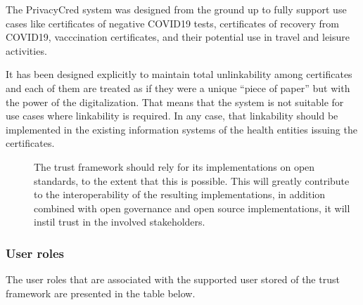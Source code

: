 \documentclass[a4paper,12pt,english]{sphinxhowto}
\begin{document}
\begin{sphinxShadowBox}

\sphinxAtStartPar
The PrivacyCred system was designed from the ground up to fully support use cases like certificates of negative COVID\sphinxhyphen{}19 tests, certificates of recovery from COVID\sphinxhyphen{}19, vacccination certificates, and their potential use in travel and leisure activities.

\sphinxAtStartPar
It has been designed explicitly to maintain total unlinkability among certificates and each of them are treated as if they were a unique “piece of paper” but with the power of the digitalization. That means that the system is not suitable for use cases where linkability is required. In any case, that linkability should be implemented in the existing information systems of the health entities issuing the certificates.
\end{sphinxShadowBox}
\begin{description}
\item[{}] \leavevmode
\sphinxAtStartPar
The trust framework should rely for its implementations on open standards, to the extent that this is possible. This will greatly contribute to the interoperability of the resulting implementations, in addition combined with open governance and open source implementations, it will instil trust in the involved stakeholders.

\end{description}


\subsubsection{User roles}
\label{\detokenize{ssi/annotehealth:user-roles}}
\sphinxAtStartPar
The user roles that are associated with the supported user stored of the trust framework are presented in the table below.
\end{document}
